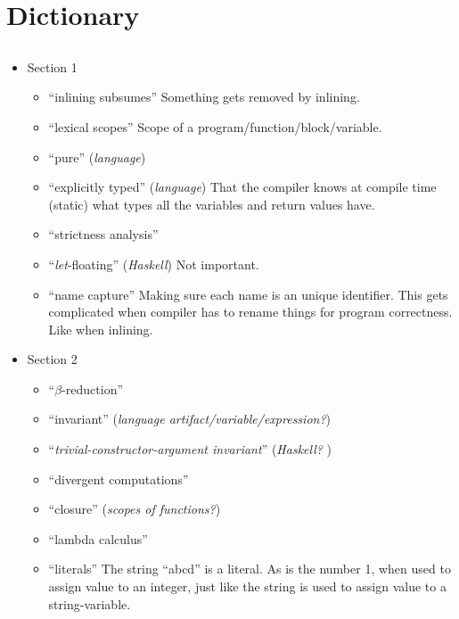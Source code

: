
\section{Dictionary}


\subsection{\cite{GHC-paper}}
\begin{itemize}

	\item Section 1
\begin{itemize}

	\item ``inlining subsumes''
Something gets removed by inlining.

	\item ``lexical scopes''
Scope of a program/function/block/variable.

	\item ``pure'' (\textit{language})

	\item ``explicitly typed'' (\textit{language})
That the compiler knows at compile time (static) what types all the variables
and return values have.

	\item ``strictness analysis''

	\item ``\textit{let}-floating'' (\textit{Haskell})
Not important.

	\item ``name capture''
Making sure each name is an unique identifier. This gets complicated when
compiler has to rename things for program correctness. Like when inlining.

\end{itemize}

	\item Section 2
\begin{itemize}

	\item ``\textit{$\beta$}-reduction''
	\item ``invariant'' (\textit{language artifact/variable/expression?})
	\item ``\textit{trivial-constructor-argument invariant}'' (\textit{Haskell?
})
	\item ``divergent computations''
	\item ``closure'' (\textit{scopes of functions?})
	\item ``lambda calculus''
	\item ``literals''
The string ``abcd'' is a literal. As is the number 1, when used to assign value
to an integer, just like the string is used to assign value to a string-variable.


\end{itemize}
\end{itemize}
